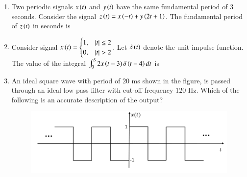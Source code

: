 \documentclass[journal,12pt,onecolumn]{IEEEtran}
\theoremstyle{remark}
\begin{document}
\begin{enumerate}
    \item Two periodic signals $x\left(t\right)$ and $y\left(t\right)$ have the same fundamental period of $3$ seconds. Consider the signal $z\left(t\right)=x\left(-t\right)+y\left(2t+1\right)$. The fundamental period of $z\left(t\right)$ in seconds is
    
    \hfill{}
    \begin{enumerate}
    \end{enumerate}

    \item Consider signal $x\left(t\right)=\begin{cases}1, & \left\vert t\right\vert \le 2\\ 0, & \left\vert t\right\vert>2\end{cases}$. Let $\delta\left(t\right)$ denote the unit impulse  function. The value of the integral $\int_{0}^{5}2x\left(t-3\right)\delta\left(t-4\right)dt$ is
    
    \hfill{}
    \begin{enumerate}
    \end{enumerate}

    \item An ideal square wave with period of $20$ ms shown in the figure, is passed through an ideal low pass filter with cut-off frequency $120$ Hz. Which of the following is an accurate description of the output?
    \begin{figure}[H]
        \centering
        \includegraphics[width=0.8\columnwidth]{q11.png}
        \caption*{}
        \label{fig:q11}
    \end{figure}
    

\end{enumerate}
\end{document}
